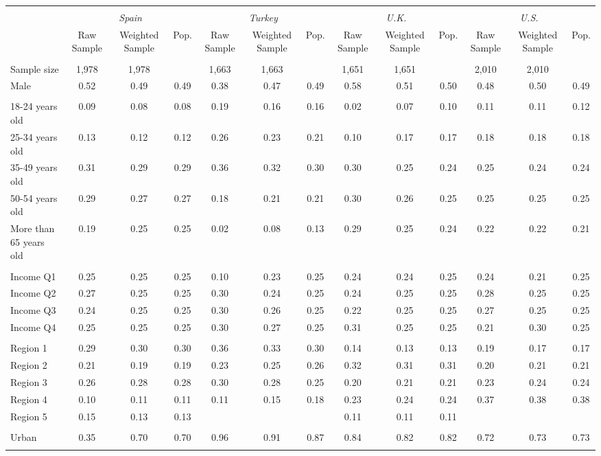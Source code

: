\begin{tabular}{l*{12}{c}}
\toprule
\hline \\[-1.8ex]
\multicolumn{1}{c}{\em{ }} & \multicolumn{3}{c}{\em{Spain}} & \multicolumn{3}{c}{\em{Turkey}} & \multicolumn{3}{c}{\em{U.K.}} & \multicolumn{3}{c}{\em{U.S.}} \\
\cmidrule(l{3pt}r{3pt}){2-4} \cmidrule(l{3pt}r{3pt}){5-7} \cmidrule(l{3pt}r{3pt}){8-10} \cmidrule(l{3pt}r{3pt}){11-13}
\noalign{\smallskip}  & Raw Sample & Weighted Sample & Pop. & Raw Sample & Weighted Sample & Pop. & Raw Sample & Weighted Sample & Pop. & Raw Sample & Weighted Sample & Pop. \\
\hline \\[-1.8ex] 
Sample size & 1,978 & 1,978 & & 1,663 & 1,663 & & 1,651 & 1,651 & & 2,010 & 2,010 & \\
\noalign{\smallskip}\hline \noalign{\smallskip}Male & 0.52 & 0.49 & 0.49 & 0.38 & 0.47 & 0.49 & 0.58 & 0.51 & 0.50 & 0.48 & 0.50 & 0.49 \\ 
\\
18-24 years old & 0.09 & 0.08 & 0.08 & 0.19 & 0.16 & 0.16 & 0.02 & 0.07 & 0.10 & 0.11 & 0.11 & 0.12 \\
25-34 years old & 0.13 & 0.12 & 0.12 & 0.26 & 0.23 & 0.21 & 0.10 & 0.17 & 0.17 & 0.18 & 0.18 & 0.18 \\
35-49 years old & 0.31 & 0.29 & 0.29 & 0.36 & 0.32 & 0.30 & 0.30 & 0.25 & 0.24 & 0.25 & 0.24 & 0.24 \\
50-54 years old & 0.29 & 0.27 & 0.27 & 0.18 & 0.21 & 0.21 & 0.30 & 0.26 & 0.25 & 0.25 & 0.25 & 0.25 \\
More than 65 years old & 0.19 & 0.25 & 0.25 & 0.02 & 0.08 & 0.13 & 0.29 & 0.25 & 0.24 & 0.22 & 0.22 & 0.21 \\ 
\\
Income Q1 & 0.25 & 0.25 & 0.25 & 0.10 & 0.23 & 0.25 & 0.24 & 0.24 & 0.25 & 0.24 & 0.21 & 0.25 \\
Income Q2 & 0.27 & 0.25 & 0.25 & 0.30 & 0.24 & 0.25 & 0.24 & 0.25 & 0.25 & 0.28 & 0.25 & 0.25 \\
Income Q3 & 0.24 & 0.25 & 0.25 & 0.30 & 0.26 & 0.25 & 0.22 & 0.25 & 0.25 & 0.27 & 0.25 & 0.25 \\
Income Q4 & 0.25 & 0.25 & 0.25 & 0.30 & 0.27 & 0.25 & 0.31 & 0.25 & 0.25 & 0.21 & 0.30 & 0.25 \\
\\
Region 1 & 0.29 & 0.30 & 0.30 & 0.36 & 0.33 & 0.30 & 0.14 & 0.13 & 0.13 & 0.19 & 0.17 & 0.17 \\
Region 2 & 0.21 & 0.19 & 0.19 & 0.23 & 0.25 & 0.26 & 0.32 & 0.31 & 0.31 & 0.20 & 0.21 & 0.21 \\
Region 3 & 0.26 & 0.28 & 0.28 & 0.30 & 0.28 & 0.25 & 0.20 & 0.21 & 0.21 & 0.23 & 0.24 & 0.24 \\
Region 4 & 0.10 & 0.11 & 0.11 & 0.11 & 0.15 & 0.18 & 0.23 & 0.24 & 0.24 & 0.37 & 0.38 & 0.38 \\
Region 5 & 0.15 & 0.13 & 0.13 & & & & 0.11 & 0.11 & 0.11 & & & \\
\\
Urban & 0.35 & 0.70 & 0.70 & 0.96 & 0.91 & 0.87 & 0.84 & 0.82 & 0.82 & 0.72 & 0.73 & 0.73 \\
\\
\bottomrule
\end{tabular}